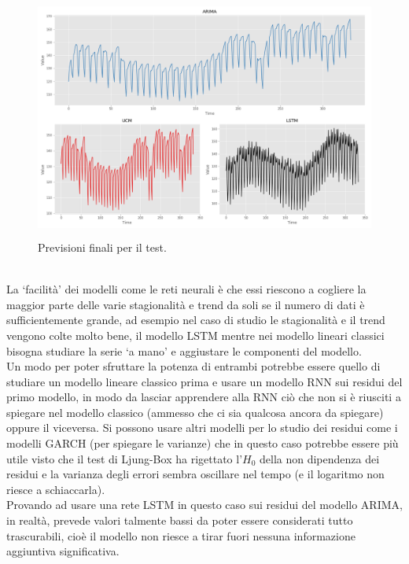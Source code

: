 \documentclass[12pt, onecolumn]{article}
\begin{document}
\begin{figure}[!h]
  \centering
  \includegraphics[width=\linewidth,height=8cm]{imgs/test_results.png}
  \caption{Previsioni finali per il test.}
  \label{fig:test_pred}
\end{figure}\\
La `facilità' dei modelli come le reti neurali è che essi riescono a cogliere la maggior parte delle varie stagionalità e trend da soli se il numero di dati è sufficientemente grande, ad esempio nel caso di studio le stagionalità e il trend vengono colte molto bene, il modello LSTM mentre nei modello lineari classici bisogna studiare la serie `a mano' e aggiustare le componenti del modello.\\
Un modo per poter sfruttare la potenza di entrambi potrebbe essere quello di studiare un modello lineare classico prima e usare un modello RNN sui residui del primo modello, in modo da lasciar apprendere alla RNN ciò che non si è riusciti a spiegare nel modello classico (ammesso che ci sia qualcosa ancora da spiegare) oppure il viceversa.
Si possono usare altri modelli per lo studio dei residui come i modelli GARCH (per spiegare le varianze) che in questo caso potrebbe essere più utile visto che il test di Ljung-Box ha rigettato l'$H_0$ della non dipendenza dei residui e la varianza degli errori sembra oscillare nel tempo (e il logaritmo non riesce a schiaccarla).\\
Provando ad usare una rete LSTM in questo caso sui residui del modello ARIMA, in realtà, prevede valori talmente bassi da poter essere considerati tutto trascurabili, cioè il modello non riesce a tirar fuori nessuna informazione aggiuntiva significativa.
\end{document}
